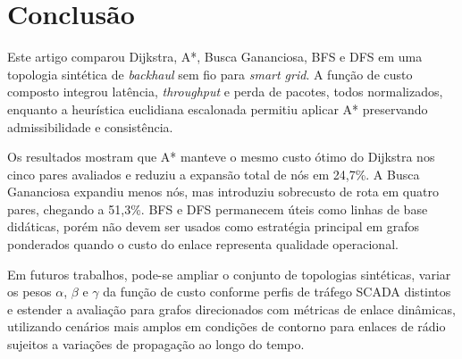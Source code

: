 \documentclass[conference]{IEEEtran}
\begin{document}
\section{Conclusão}

Este artigo comparou Dijkstra, A*, Busca Gananciosa, BFS e DFS em uma
topologia sintética de \textit{backhaul} sem fio para \textit{smart grid}. A 
função de custo composto integrou latência, \textit{throughput} e perda de 
pacotes, todos normalizados, enquanto a heurística euclidiana escalonada 
permitiu aplicar A* preservando admissibilidade e consistência.

Os resultados mostram que A* manteve o mesmo custo ótimo do Dijkstra nos
cinco pares avaliados e reduziu a expansão total de nós em 24{,}7\%. A Busca
Gananciosa expandiu menos nós, mas introduziu sobrecusto de rota em quatro
pares, chegando a 51{,}3\%. BFS e DFS permanecem úteis como linhas de base
didáticas, porém não devem ser usados como estratégia principal em grafos
ponderados quando o custo do enlace representa qualidade operacional.

Em futuros trabalhos, pode-se ampliar o conjunto de topologias sintéticas, 
variar os pesos $\alpha$, $\beta$ e $\gamma$ da função de custo
conforme perfis de tráfego SCADA distintos e estender a avaliação para grafos
direcionados com métricas de enlace dinâmicas, utilizando cenários mais amplos
em condições de contorno para enlaces de rádio sujeitos a variações de 
propagação ao longo do tempo.



\end{document}
